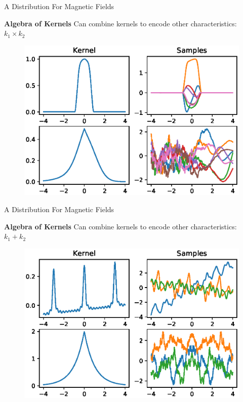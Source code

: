 \documentclass{beamer}
\begin{document}
\begin{frame}{A Distribution For Magnetic Fields}

  \textbf{Algebra of Kernels} Can combine kernels to encode other characteristics: $k_1 \times k_2$

  \begin{figure}
    \includegraphics[width=\linewidth]{plots/multiply.eps}
  \end{figure}

\end{frame}

\begin{frame}{A Distribution For Magnetic Fields}

  \textbf{Algebra of Kernels} Can combine kernels to encode other characteristics: $k_1 + k_2$

  \begin{figure}
    \includegraphics[width=\linewidth]{plots/sum.eps}
  \end{figure}

\end{frame}
\end{document}
